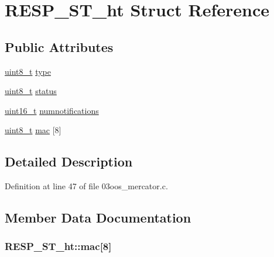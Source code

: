 \hypertarget{struct_r_e_s_p___s_t__ht}{}\section{R\+E\+S\+P\+\_\+\+S\+T\+\_\+ht Struct Reference}
\label{struct_r_e_s_p___s_t__ht}
\subsection*{Public Attributes}
\begin{DoxyCompactItemize}
\item 
\hyperlink{_p_e___types_8h_aba7bc1797add20fe3efdf37ced1182c5}{uint8\+\_\+t} \hyperlink{struct_r_e_s_p___s_t__ht_a5945569c8edf3063534e70fceda55209}{type}
\item 
\hyperlink{_p_e___types_8h_aba7bc1797add20fe3efdf37ced1182c5}{uint8\+\_\+t} \hyperlink{struct_r_e_s_p___s_t__ht_adb3873f2c28de5b112e5c306b812938c}{status}
\item 
\hyperlink{_p_e___types_8h_a1f1825b69244eb3ad2c7165ddc99c956}{uint16\+\_\+t} \hyperlink{struct_r_e_s_p___s_t__ht_ac28e59c8cccb2b247ed31f64e11b1d7a}{numnotifications}
\item 
\hyperlink{_p_e___types_8h_aba7bc1797add20fe3efdf37ced1182c5}{uint8\+\_\+t} \hyperlink{struct_r_e_s_p___s_t__ht_ab0ae9f296a781334076dcb24a36628d3}{mac} \mbox{[}8\mbox{]}
\end{DoxyCompactItemize}


\subsection{Detailed Description}


Definition at line 47 of file 03oos\+\_\+mercator.\+c.



\subsection{Member Data Documentation}
\subsubsection[{\texorpdfstring{mac}{mac}}]{ R\+E\+S\+P\+\_\+\+S\+T\+\_\+ht\+::mac\mbox{[}8\mbox{]}}\hypertarget{struct_r_e_s_p___s_t__ht_ab0ae9f296a781334076dcb24a36628d3}{}\label{struct_r_e_s_p___s_t__ht_ab0ae9f296a781334076dcb24a36628d3}


